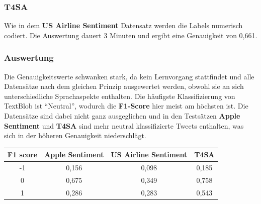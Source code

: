 \subsubsection*{T4SA}
Wie in dem \textbf{US Airline Sentiment} Datensatz werden die Labels numerisch codiert. Die Auswertung dauert 3 Minuten und ergibt eine Genauigkeit von 0,661.

\subsubsection*{Auswertung}
Die Genauigkeitswerte schwanken stark, da kein Lernvorgang stattfindet und alle Datens\"atze nach dem gleichen Prinzip ausgewertet werden, obwohl sie an sich unterschiedliche Sprachaspekte enthalten. Die h\"aufigste Klassifizierung von TextBlob ist "`Neutral"', wodurch die \textbf{F1-Score} hier meist am h\"ochsten ist. Die Datens\"atze sind dabei nicht ganz ausgeglichen und in den Tests\"atzen \textbf{Apple Sentiment} und \textbf{T4SA} sind mehr neutral klassifizierte Tweets enthalten, was sich in der h\"oheren Genauigkeit niederschl\"agt.
\begin{center}
\begin{tabular}{|c||c|c|c|}
\hline
F1 score & Apple Sentiment & US Airline Sentiment & T4SA\\ 
\hline\hline
-1 & 0,156 & 0,098 & 0,185\\
\hline
0 & 0,675 & 0,349 & 0,758\\ 
\hline
1 & 0,286 & 0,283 & 0,543\\
\hline    
\end{tabular}
\end{center}

